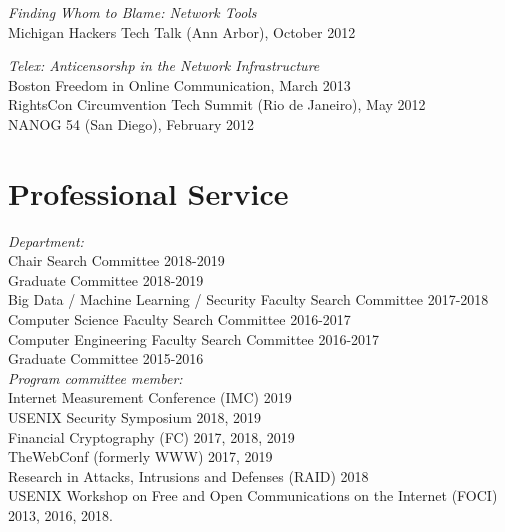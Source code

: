 \documentclass[margin,11pt]{res} %
\begin{document}

\emph{Finding Whom to Blame: Network Tools} \\
    Michigan Hackers Tech Talk (Ann Arbor), October 2012

\emph{Telex: Anticensorshp in the Network Infrastructure} \\
    Boston Freedom in Online Communication, March 2013\\
    RightsCon Circumvention Tech Summit (Rio de Janeiro), May 2012 \\
    NANOG 54 (San Diego), February 2012 %




\vspace{6pt}
\section{\large Professional Service}

    \emph{Department:}\\
        Chair Search Committee 2018-2019 \\
        Graduate Committee 2018-2019 \\
        Big Data / Machine Learning / Security Faculty Search Committee 2017-2018 \\
        Computer Science Faculty Search Committee 2016-2017 \\
        Computer Engineering Faculty Search Committee 2016-2017 \\
        Graduate Committee 2015-2016 \\

     \emph{Program committee member:}\\
            Internet Measurement Conference (IMC) 2019  \\
            USENIX Security Symposium 2018, 2019    \\
            Financial Cryptography (FC) 2017, 2018, 2019 \\
            TheWebConf (formerly WWW) 2017, 2019 \\
            Research in Attacks, Intrusions and Defenses (RAID) 2018 \\
            USENIX Workshop on Free and Open Communications on the Internet (FOCI) 2013, 2016, 2018. \\
     
\end{document}
